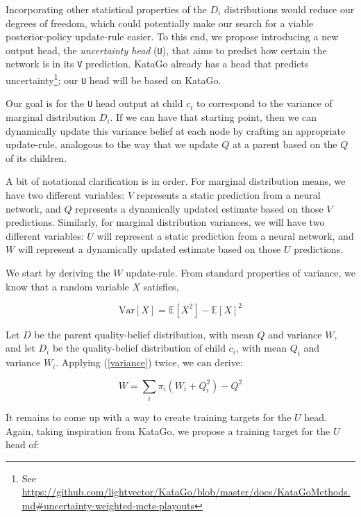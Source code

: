 \documentclass[tikz]{article}
\newcommand{\Var}{\mathrm{Var}}
\begin{document}
Incorporating other statistical properties of the $D_i$ distributions would reduce our degrees of freedom, which could potentially
make our search for a viable posterior-policy update-rule easier. To this end, we propose introducing a new output head, the \emph{uncertainty head} (\texttt{U}),
that aims to predict how certain the network is in its \texttt{V} prediction. KataGo already has a head that predicts uncertainty\footnote{See \url{https://github.com/lightvector/KataGo/blob/master/docs/KataGoMethods.md\#uncertainty-weighted-mcts-playouts}}; our \texttt{U} head will
be based on KataGo. \newline

Our goal is for the \texttt{U} head output at child $c_i$ to correspond to the variance of marginal distribution $D_i$. If we can have
that starting point, then we can dynamically update this variance belief at each node by crafting an appropriate update-rule, analogous
to the way that we update $Q$ at a parent based on the $Q$ of its children. \newline

A bit of notational clarification is in order. For marginal distribution means, we have two different variables: $V$ represents a static prediction
from a neural network, and $Q$ represents a dynamically updated estimate based on those $V$ predictions. Similarly, for marginal distribution
variances, we will have two different variables: $U$ will represent a static prediction from a neural network, and $W$ will represent
a dynamically updated estimate based on those $U$ predictions. \newline

We start by deriving the $W$ update-rule. From standard properties of variance, we know that a random variable $X$ satisfies,

\begin{equation}
\label{variance}    
\Var[X] = \mathbb{E}[X^2] - \mathbb{E}[X]^2
\end{equation}

Let $D$ be the parent quality-belief distribution, with mean $Q$ and variance $W$, and let $D_i$ be the quality-belief distribution of
child $c_i$, with mean $Q_i$ and variance $W_i$. Applying (\ref{variance}) twice, we can derive:

\begin{equation}
\label{W-update}    
W = \sum_{i} \pi_i (W_i + Q_i^2) - Q^2
\end{equation}

It remains to come up with a way to create training targets for the $U$ head. Again, taking inspiration from KataGo, we propose
a training target for the $U$ head of:
\end{document}
